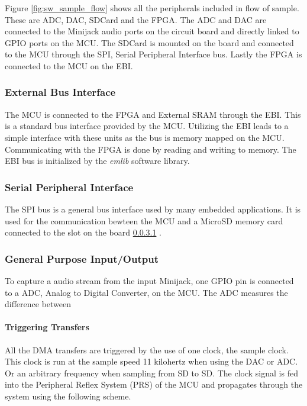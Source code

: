 
Figure \ref{fig:sw_sample_flow} shows all the peripherals included in flow of sample. 
These are ADC, DAC, SDCard and the FPGA. The ADC and DAC are connected to the Minijack
audio ports on the circuit board and directly linked to GPIO ports on the MCU. The SDCard
is mounted on the board and connected to the MCU through the SPI, Serial Peripheral Interface
bus. Lastly the FPGA is connected to the MCU on the EBI.

\subsubsection{External Bus Interface}
The MCU is connected to the FPGA and External SRAM through the EBI. This is a standard
bus interface provided by the MCU. Utilizing the EBI leads to a
simple interface with these units as the bus is memory mapped on the MCU.
Communicating with the FPGA is done by reading and writing to memory.
The EBI bus is initialized by the {\it emlib} software library.

\subsubsection{Serial Peripheral Interface}
The SPI bus is a general bus interface used by many embedded applications. It is used
for the communication bewteen the MCU and a MicroSD memory card connected to the slot
on the board \ref{} .

\subsubsection{General Purpose Input/Output}
To capture a audio stream from the input Minijack, one GPIO pin is connected to a 
ADC, Analog to Digital Converter, on the MCU. The ADC measures the difference between



\paragraph{Triggering Transfers}

All the DMA transfers are triggered by the use of one clock, the sample clock.
This clock is run at the sample speed 11 kilohertz when using the DAC or ADC. Or
an arbitrary frequency when sampling from SD to SD. The clock signal is fed into
the Peripheral Reflex System  (PRS) of the MCU and propagates through the system
using the following scheme.

